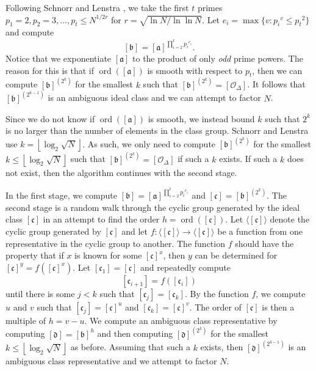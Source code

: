 \documentclass{ucalgthes1}
\theoremstyle{definition}
\DeclareMathOperator{\ord}{ord}
\newcommand{\floor}[1]{\left\lfloor #1 \right\rfloor}
\newcommand{\aclass}{[\mathfrak a]}
\newcommand{\bclass}{[\mathfrak b]}
\newcommand{\cclass}{[\mathfrak c]}
\newcommand{\dclass}{[\mathfrak d]}
\newcommand{\idclass}{[\mathcal O_\Delta]}
\begin{document}
Following Schnorr and Lenstra \cite{Schnorr1984}, we take the first $t$ primes $p_1 = 2, p_2 = 3, ..., p_t \le N^{1/2r}$ for $r = \sqrt{\ln N / \ln \ln N}$.  Let $e_i = \max \{ v : {p_i}^v \le {p_t}^2 \}$ and compute
\[
	\bclass = \aclass^{\prod_{i=2}^t {p_i}^{e_i}}.
\]
Notice that we exponentiate $\aclass$ to the product of only \emph{odd} prime powers.  The reason for this is that if $\ord(\aclass)$ is smooth with respect to $p_t$, then we can compute $\bclass^{\left(2^k\right)}$ for the smallest $k$ such that $\bclass^{\left(2^k\right)} = \idclass$.  It follows that $\bclass^{\left(2^{k-1}\right)}$ is an ambiguous ideal class and we can attempt to factor $N$.

Since we do not know if $\ord(\aclass)$ is smooth, we instead bound $k$ such that $2^k$ is no larger than the number of elements in the class group.  Schnorr and Lenstra \cite[p.291]{Schnorr1984} use $k = \floor{\log_2{\sqrt N}}$.  As such, we only need to compute $\bclass^{\left(2^k\right)}$ for the smallest $k \le \floor{\log_2{\sqrt N}}$ such that $\bclass^{\left(2^k\right)} = \idclass$ if such a $k$ exists. If such a $k$ does not exist, then the algorithm continues with the second stage.

In the first stage, we compute $\bclass = \aclass^{\prod_{i=2}^t {p_i}^{e_i}}$ and $\cclass = \bclass^{\left(2^k\right)}$.  The second stage is a random walk through the cyclic group generated by the ideal class $\cclass$ in an attempt to find the order $h = \ord(\cclass)$.  Let $\langle \cclass \rangle$ denote the cyclic group generated by $\cclass$ and let $f : \langle \cclass \rangle \rightarrow \langle \cclass \rangle$ be a function from one representative in the cyclic group to another.  The function $f$ should have the property that if $x$ is known for some $\cclass ^x$, then $y$ can be determined for $\cclass^y = f(\cclass^x)$.  Let $[\mathfrak c_1] = \cclass$ and repeatedly compute
\[
	[\mathfrak c_{i+1}] = f([\mathfrak c_i])
\]
until there is some $j < k$ such that $[\mathfrak c_j] = [\mathfrak c_k]$.  By the function $f$, we compute $u$ and $v$ such that $[\mathfrak c_j]=\cclass^u$ and $[\mathfrak c_k]=\cclass^v$.  The order of $\cclass$ is then a multiple of $h = v - u$.  We compute an ambiguous class representative by computing $\dclass = \bclass^h$ and then computing $\dclass^{\left(2^k\right)}$ for the smallest $k \le \floor{\log_2{\sqrt N}}$ as before.  Assuming that such a $k$ exists, then $\dclass^{\left(2^{k-1}\right)}$ is an ambiguous class representative and we attempt to factor $N$.
\end{document}
